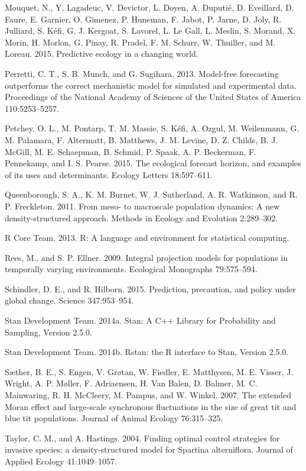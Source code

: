 \documentclass[12pt,]{article}
\begin{document}
Mouquet, N., Y. Lagadeuc, V. Devictor, L. Doyen, A. Duputi{é}, D.
Eveillard, D. Faure, E. Garnier, O. Gimenez, P. Huneman, F. Jabot, P.
Jarne, D. Joly, R. Julliard, S. K{é}fi, G. J. Kergoat, S. Lavorel, L.
{Le Gall}, L. Meslin, S. Morand, X. Morin, H. Morlon, G. Pinay, R.
Pradel, F. M. Schurr, W. Thuiller, and M. Loreau. 2015. Predictive
ecology in a changing world.

Perretti, C. T., S. B. Munch, and G. Sugihara. 2013. Model-free
forecasting outperforms the correct mechanistic model for simulated and
experimental data. Proceedings of the National Academy of Sciences of
the United States of America 110:5253--5257.

Petchey, O. L., M. Pontarp, T. M. Massie, S. K{é}fi, A. Ozgul, M.
Weilenmann, G. M. Palamara, F. Altermatt, B. Matthews, J. M. Levine, D.
Z. Childs, B. J. McGill, M. E. Schaepman, B. Schmid, P. Spaak, A. P.
Beckerman, F. Pennekamp, and I. S. Pearse. 2015. The ecological forecast
horizon, and examples of its uses and determinants. Ecology Letters
18:597--611.

Queenborough, S. A., K. M. Burnet, W. J. Sutherland, A. R. Watkinson,
and R. P. Freckleton. 2011. From meso- to macroscale population
dynamics: A new density-structured approach. Methods in Ecology and
Evolution 2:289--302.

R Core Team. 2013. R: A language and environment for statistical
computing.

Rees, M., and S. P. Ellner. 2009. Integral projection models for
populations in temporally varying environments. Ecological Monographs
79:575--594.

Schindler, D. E., and R. Hilborn. 2015. Prediction, precaution, and
policy under global change. Science 347:953--954.

Stan Development Team. 2014a. Stan: A C++ Library for Probability and
Sampling, Version 2.5.0.

Stan Development Team. 2014b. Rstan: the R interface to Stan, Version
2.5.0.

S{æ}ther, B. E., S. Engen, V. Gr{ø}tan, W. Fiedler, E. Matthysen, M. E.
Visser, J. Wright, A. P. M{ø}ller, F. Adriaensen, H. {Van Balen}, D.
Balmer, M. C. Mainwaring, R. H. McCleery, M. Pampus, and W. Winkel.
2007. The extended Moran effect and large-scale synchronous fluctuations
in the size of great tit and blue tit populations. Journal of Animal
Ecology 76:315--325.

Taylor, C. M., and A. Hastings. 2004. Finding optimal control strategies
for invasive species: a density-structured model for Spartina
alterniflora. Journal of Applied Ecology 41:1049--1057.
\end{document}
